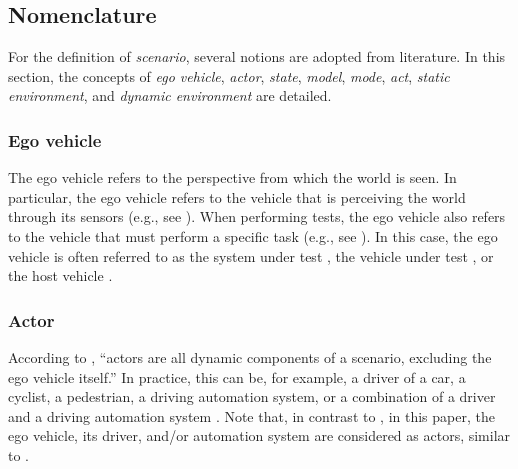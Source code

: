 


\subsection{Nomenclature}
\label{sec:nomenclature}

For the definition of \emph{scenario}, several notions are adopted from literature. In this section, the concepts of \emph{ego vehicle}, \emph{actor}, \emph{state}, \emph{model}, \emph{mode}, \cbstartc\emph{act}\cbend, \emph{static environment}, and \emph{dynamic environment} are detailed. 

\subsubsection{Ego vehicle}
\label{sec:ego vehicle}
The ego vehicle refers to the perspective from which the world is seen. In particular, the ego vehicle refers to the vehicle that is perceiving the world through its sensors (e.g., see \cite{Bonnin2014}). When performing tests, the ego vehicle also refers to the vehicle that must perform a specific task (e.g., see \cite{althoff2017CommonRoad}). In this case, the ego vehicle is often referred to as the system under test \cite{stellet2015taxonomy}, the vehicle under test \cite{gietelink2006development}, or the host vehicle \cite{gietelink2006development}.

\subsubsection{Actor}
\label{sec:actor}
\cbstart
According to \textcite{catapult2018musicc}, ``actors are all dynamic components of a scenario, excluding the ego vehicle itself.'' In practice, this can be, for example, a driver of a car, a cyclist, a pedestrian, a driving automation system, or a combination of a driver and a driving automation system \cite{geyer2014}. Note that, in contrast to \cite{catapult2018musicc}, in this paper, the ego vehicle, its driver, and/or automation system are considered as actors, similar to \cite{geyer2014}.%
\cbend

